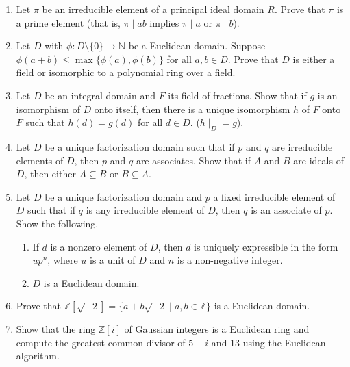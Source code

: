\documentclass{article}
\theoremstyle{definition}
\newcommand{\Z}{\mathbb{Z}}
\newcommand{\N}{\mathbb{N}}
\begin{document}
\begin{enumerate}
            \item Let $\pi$ be an irreducible element of a principal ideal domain $R$. Prove that $\pi$ is a prime element (that is, $\pi \mid ab$ implies $\pi \mid a$ or $\pi \mid b$).
            
            \item Let $D$ with $\phi : D\setminus \{0\} \to \N$ be a Euclidean domain. Suppose $\phi(a+b) \leq \max \{\phi(a),\phi(b)\}$ for all $a,b\in D$. Prove that $D$ is either a field or isomorphic to a polynomial ring over a field.
            
            \item Let $D$ be an integral domain and $F$ its field of fractions. Show that if $g$ is an isomorphism of $D$ onto itself, then there is a unique isomorphism $h$ of $F$ onto $F$ such that $h(d)=g(d)$ for all $d\in D$. ($h\mid_D=g$).
            
            \item Let $D$ be a unique factorization domain such that if $p$ and $q$ are irreducible elements of $D$, then $p$ and $q$ are associates. Show that if $A$ and $B$ are ideals of $D$, then either $A\subseteq B$ or $B\subseteq A$.
            
            \item Let $D$ be a unique factorization domain and $p$ a fixed irreducible element of $D$ such that if $q$ is any irreducible element of $D$, then $q$ is an associate of $p$. Show the following.
            
            \begin{enumerate}
                \item If $d$ is a nonzero element of $D$, then $d$ is uniquely expressible in the form $up^n$, where $u$ is a unit of $D$ and $n$ is a non-negative integer.
                \item $D$ is a Euclidean domain.
            \end{enumerate}

            \item Prove that $\Z[\sqrt{-2}]=\{a+b\sqrt{-2} \mid a,b \in \Z\}$ is a Euclidean domain.
            
            \item Show that the ring $\Z[i]$ of Gaussian integers is a Euclidean ring and compute the greatest common divisor of $5+i$ and $13$ using the Euclidean algorithm.


\end{enumerate}
\end{document}
